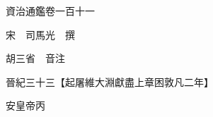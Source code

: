 










 


 
 


 

  
  
  
  
  





  
  
  
  
  
 
  

  

  
  
  



  

 
 

  
   




  

  
  


  　　資治通鑑卷一百十一

　　宋　司馬光　撰

　　胡三省　音注

　　晉紀三十三【起屠維大淵獻盡上章困敦凡二年】

　　安皇帝丙

